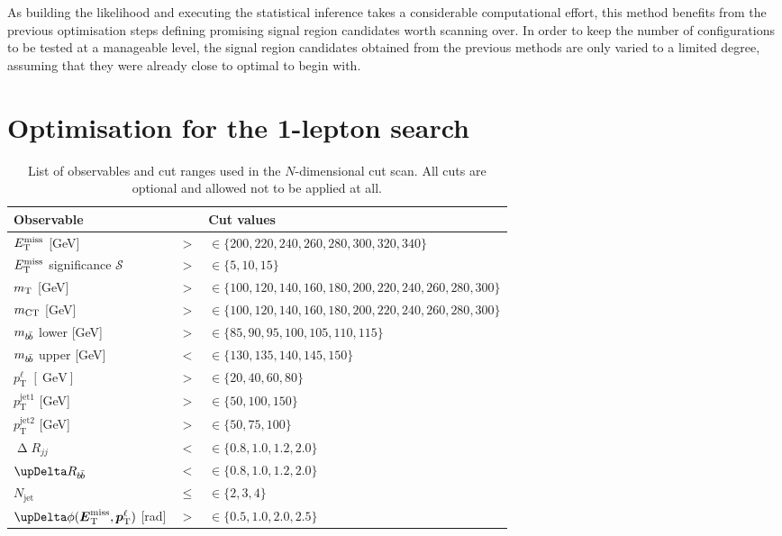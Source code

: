 As building the likelihood and executing the statistical inference takes a considerable computational effort, this method benefits from the previous optimisation steps defining promising signal region candidates worth scanning over.
In order to keep the number of configurations to be tested at a manageable level, the signal region candidates obtained from the previous methods are only varied to a limited degree, assuming that they were already close to optimal to begin with.

\section{Optimisation for the 1-lepton search}

\begin{table}
	\centering
	\small
	\setlength\heavyrulewidth{0.2ex}
	\caption{List of observables and cut ranges used in the $N$-dimensional cut scan. All cuts are optional and allowed not to be applied at all.}
	\begin{tabular} {l c l}
		\toprule
		Observable &  & Cut values \\ 
		\midrule
		$E_{\textrm{T}}^{\textrm{miss}}$ [GeV]& $>$ & $\in \{200,220,240,260,280,300,320,340\}$ \\
		$E_{\textrm{T}}^{\textrm{miss}}$ significance $\mathcal{S}$ & $>$ & $\in \{5,10,15\}$ \\
		$m_{\textrm{T}}$ [GeV]& $>$ & $\in \{100, 120, 140,160,180,200,220,240,260,280, 300\}$ \\
		$m_{\textrm{CT}}$ [GeV]& $>$ & $\in \{100, 120, 140,160,180,200,220,240,260,280, 300\}$ \\
		$m_{b\hspace{-0.06em}\bar{b}}$ lower [GeV]& $>$ & $\in \{85,90,95,100,105,110,115\}$ \\
		$m_{b\hspace{-0.06em}\bar{b}}$ upper [GeV]& $<$ & $\in \{130,135,140,145,150\}$ \\
		$p_\textrm{T}^\ell$ $[\SI{}{\GeV}]$& $>$ & $\in \{20, 40, 60, 80\}$ \\
		$p_\textrm{T}^\mathrm{jet1}$ [GeV]& $>$ & $\in \{50, 100, 150\}$ \\
		$p_\textrm{T}^\mathrm{jet2}$ [GeV]& $>$ & $\in \{50, 75, 100\}$ \\	
		$\upDelta R_{jj}$ & $<$ & $\in \{0.8,1.0,1.2,2.0\}$ \\
		$\upDelta R_{b\hspace{-0.06em}\bar{b}}$ & $<$ & $\in \{0.8,1.0,1.2,2.0\}$ \\
		$N_\mathrm{jet}$ & $\leq$ & $\in \{2,3,4\}$ \\			
		$\upDelta\phi (\vetmiss,\vptlep )$ [rad]& $>$ & $\in \{0.5,1.0,2.0,2.5\}$ \\
		\bottomrule					
	\end{tabular}\vspace{2mm}
	\label{tab:cut_scan}   
\end{table}

